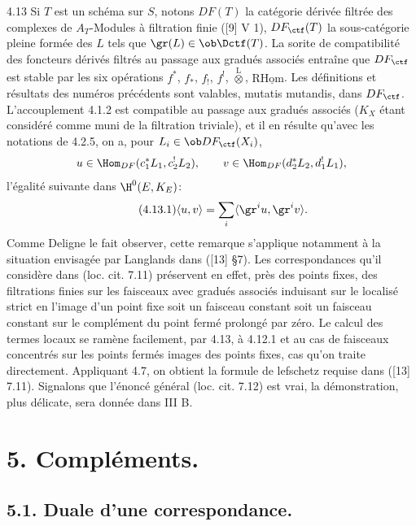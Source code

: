 \begin{statement}{4.13}
Si $T$ est un schéma sur $S$, notons $DF(T)$ la catégorie dérivée filtrée des complexes de $A_T$-Modules à filtration finie ([9] V 1), $DF_{\ctf}(T)$ la sous-catégorie pleine formée des $L$ tels que $\gr(L)\in\ob\Dctf(T)$. La sorite de compatibilité des foncteurs dérivés filtrés au passage aux gradués associés entraîne que $DF_{\ctf}$ est stable par les six opérations $f^*$, $f_*$, $f_!$, $f^!$, $\overset{\mathrm{L}}{\otimes}$, $\mathrm{R}\underline{\mathrm{Hom}}$. Les définitions et résultats des numéros précédents sont valables, mutatis mutandis, dans $DF_{\ctf}$. L'accouplement 4.1.2 est compatible au passage aux gradués associés ($K_X$ étant considéré comme muni de la filtration triviale), et il en résulte qu'avec les notations de 4.2.5, on a, pour $L_i\in\ob DF_{\ctf}(X_i)$,
\[
u\in\Hom_{DF}(c_1^*L_1,c_2^!L_2),\qquad
v\in\Hom_{DF}(d_2^*L_2,d_1^!L_1),
\]
l'égalité suivante dans $\H^0(E,K_E)$:
\begin{equation}
\tag{4.13.1}
\langle u,v\rangle=\sum_i\langle \gr^i u,\gr^i v\rangle.
\end{equation}
Comme Deligne le fait observer, cette remarque s'applique notamment à la situation envisagée par Langlands dans ([13] §7). Les correspondances qu'il considère dans (loc. cit. 7.11) préservent en effet, près des points fixes, des filtrations finies sur les faisceaux avec gradués associés induisant sur le localisé strict en l'image d'un point fixe soit un faisceau constant soit un faisceau constant sur le complément du point fermé prolongé par zéro. Le calcul des termes locaux se ramène facilement, par 4.13, à 4.12.1 et au cas de faisceaux concentrés sur les points fermés images des points fixes, cas qu'on traite directement. Appliquant 4.7, on obtient la formule de lefschetz requise dans ([13] 7.11). Signalons que l'énoncé général (loc. cit. 7.12) est vrai, la démonstration, plus délicate, sera donnée dans III B.
\end{statement}



\section*{5. Compléments.}

\subsection*{5.1. Duale d'une correspondance.}

